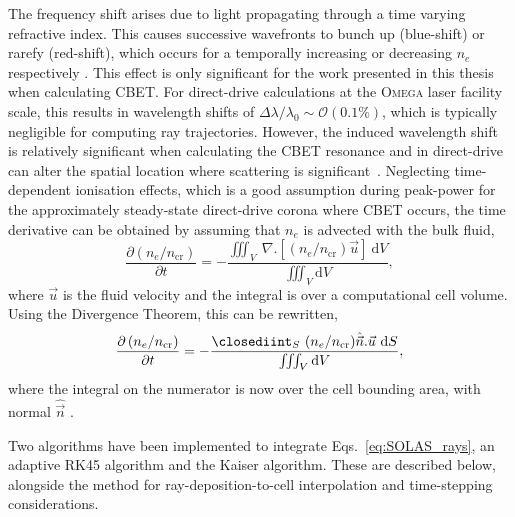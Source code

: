 The frequency shift arises due to light propagating through a time varying refractive index.
This causes successive wavefronts to bunch up (blue-shift) or rarefy (red-shift), which occurs for a temporally increasing or decreasing $n_e$ respectively \cite{dewandre_doppler_1981}.
This effect is only significant for the work presented in this thesis when calculating \ac{CBET}.
For direct-drive calculations at the \textsc{Omega} laser facility scale, this results in wavelength shifts of $\Delta \lambda/\lambda_0 \sim \mathcal{O}(0.1\%)$, which is typically negligible for computing ray trajectories.
However, the induced wavelength shift is relatively significant when calculating the \ac{CBET} resonance and in direct-drive can alter the spatial location where scattering is significant~\cite{colaitis_inverse_2021}.
Neglecting time-dependent ionisation effects, which is a good assumption during peak-power for the approximately steady-state direct-drive corona where \ac{CBET} occurs, the time derivative can be obtained by assuming that $n_e$ is advected with the bulk fluid,
\begin{equation}
    \label{eq:SOLAS_doppler}
    \frac{\partial\left(n_e / n_{\text{cr}}\right)}{\partial t} = - \frac{ \iiint_V \ \nabla.[(n_e/n_{\text{cr}})\vec{u}] \ \text{d}V }{ \iiint_V \text{d}V },
\end{equation}
where $\vec{u}$ is the fluid velocity and the integral is over a computational cell volume.
Using the Divergence Theorem, this can be rewritten,
\begin{equation}
    \label{eq:SOLAS_doppler_used}
    \frac{\partial\left(n_e / n_{\text{cr}}\right)}{\partial t} = - \frac{ \closediint_S \ (n_e/n_{\text{cr}})\hat{\vec{n}}.\vec{u} \ \text{d}S }{ \iiint_V \text{d}V },
\end{equation}
where the integral on the numerator is now over the cell bounding area, with normal $\hat{\vec{n}}$ \cite{marozas_wavelength-detuning_2018}.

Two algorithms have been implemented to integrate Eqs.~\ref{eq:SOLAS_rays}, an adaptive RK45 algorithm and the Kaiser algorithm.
These are described below, alongside the method for ray-deposition-to-cell interpolation and time-stepping considerations.

